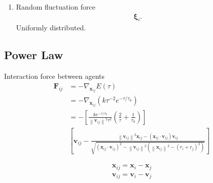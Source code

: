 \begin{enumerate}[label=\roman{enumi})]
\item 
Random fluctuation force
\begin{align}
\boldsymbol{\xi}_{i}.
\end{align}
Uniformly distributed.


\end{enumerate}


\subsection{Power Law}
Interaction force between agents
\begin{align}
\mathbf{F}_{ij} &= -\nabla_{\mathbf{x}_{ij}} E(\tau) \\
&= -\nabla_{\mathbf{x}_{ij}} \left(k \tau^{-2} e^{-\tau / \tau_{0}} \right)
\\
&= - \left[\frac{k e^{-\tau / \tau_{0}}}{\left\|\mathbf{v}_{ij}\right\|^{2} \tau^{2}} \left(\frac{2}{\tau} + \frac{1}{\tau_{0}}\right) \right] 
\\
&\left[ \mathbf{v}_{ij} - \frac{\left\|\mathbf{v}_{ij}\right\|^{2} \mathbf{x}_{ij} - \left(\mathbf{x}_{ij}\cdot\mathbf{v}_{ij}\right) \mathbf{v}_{ij} }{\sqrt{\left(\mathbf{x}_{ij}\cdot\mathbf{v}_{ij}\right)^{2} - \left\|\mathbf{v}_{ij}\right\|^{2} \left( \left\|\mathbf{x}_{ij}\right\|^{2} - \left(r_{i} + r_{j}\right)^{2} \right) }} \right]
\end{align}

\begin{align}
\mathbf{x}_{ij} = \mathbf{x}_{i} - \mathbf{x}_{j} \\
\mathbf{v}_{ij} = \mathbf{v}_{i} - \mathbf{v}_{j}
\end{align}


